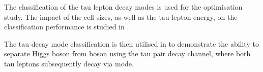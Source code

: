 
The classification of the tau lepton decay modes is used for the \ECAL optimisation study. The impact of  the \ECAL cell sizes,  as well as the tau lepton energy,  on the classification performance is studied in .

The tau decay mode classification is then utilised in  to demonstrate the ability to separate Higgs boson from \PZ  boson using the tau pair decay channel, where both tau leptons subsequently decay   via  \tauToPion mode.






